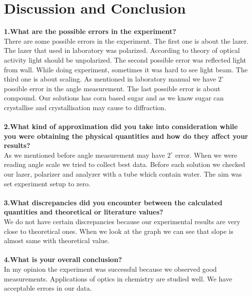 \documentclass[a4paper,12pt]{report}
\begin{document}
\chapter{Discussion and Conclusion}
\textbf{1.What are the possible errors in the experiment?}\\
There are some possible errors in the experiment. The first one is about the lazer. The lazer that used in laboratory was polarized. According to theory of optical activity light should be unpolarized. The second possible error was reflected light from wall. While doing experiment, sometimes it was hard to see light beam. The third one is about scaling. As mentioned in laboratory manual we have $2^{\circ}$ possible error in the angle measurement. The last possible error is about compound. Our solutions has corn based sugar and as we know sugar can crystallise and crystallisation may cause to diffraction. \\\\ 
\textbf{2.What kind of approximation did you take into consideration while you were obtaining the physical quantities and how do they affect your results?}\\
As we mentioned before angle measurement may have $2^{\circ}$ error. When we were reading angle scale we tried to collect best data. Before each solution we checked our lazer, polarizer and analyzer with a tube which contain water. The aim was set experiment setup to zero.\\\\   
\textbf{3.What discrepancies did you encounter between the calculated quantities and theoretical or literature values?}\\
We do not have certain discrepancies because our experimental results are very close to theoretical ones. When we look at the graph we can see that slope is almost same with theoretical value.\\\\ 
\textbf{4.What is your overall conclusion?}\\
In my opinion the experiment was successful because we observed good measurements. Applications of optics in chemistry are studied well.   
We have acceptable errors in our data.
\end{document}
